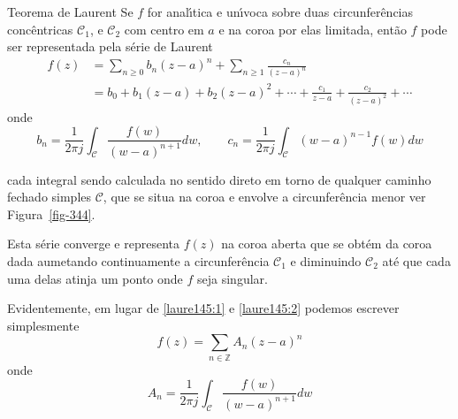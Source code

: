 \begin{theoc}{Teorema de Laurent}{} Se $f$ for anal\'{\i}tica e un\'{\i}voca
sobre duas circunfer\^{e}ncias conc\^{e}ntricas $\mathcal{C}_1$, e
$\mathcal{C}_2$ com centro em $a$ e na coroa por elas limitada,
ent\~{a}o $f$ pode ser representada pela s\'{e}rie de Laurent
\begin{align}
  f(z) & =\sum_{n\geq 0}b_n(z-a)^n+\sum_{n\geq 1}\frac{c_n}{(z-a)^n}\nonumber\\[2ex]
   & =b_0+b_1(z-a)+b_2(z-a)^2+\cdots+\frac{c_1}{z-a}+\frac{c_2}{(z-a)^2}+\cdots\label{laure145:1}
\end{align}
onde
\begin{equation}\label{laure145:2}
b_n= \frac{1}{2\pi j}\int_{\mathcal{C}}\frac{f(w)}{(w -
a)^{n+1}}dw,\qquad  c_n=\frac{1}{2\pi j}\int_{\mathcal{C}}(w -
a)^{n-1}f(w)dw
\end{equation}
\end{theoc}
cada integral sendo calculada no sentido direto em torno de
qualquer caminho fechado simples $\mathcal{C}$, que se situa na
coroa e envolve a circunfer\^{e}ncia menor ver Figura~\ref{fig-344}.

Esta s\'{e}rie converge e representa $f(z)$ na coroa aberta que se
obt\'{e}m da coroa dada aumetando continuamente a circunfer\^{e}ncia
$\mathcal{C}_1$ e diminuindo $\mathcal{C}_2$ at\'{e} que cada uma
delas atinja um ponto onde $f$ seja singular.


\begin{obs} Evidentemente, em lugar de \eqref{laure145:1} e \eqref{laure145:2} podemos escrever
simplesmente
\begin{equation}\label{laure145:3}
f(z)=\sum_{n\in \mathbb{Z}}A_n(z-a)^n
\end{equation}
onde
\begin{equation}\label{laure145:4}
A_n=\frac{1}{2\pi j}\int_{\mathcal{C}}\frac{f(w)}{(w - a)^{n+1}}dw
\end{equation}
\end{obs}

